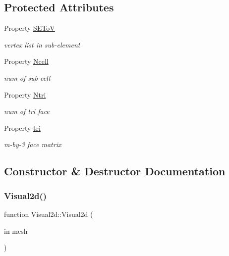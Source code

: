 \subsection*{Protected Attributes}
\begin{DoxyCompactItemize}
\item 
Property \hyperlink{class_visual2d_ac0c516e7d0e1f95d603d402d08aa7b1f}{S\+E\+ToV}
\begin{DoxyCompactList}\small\item\em vertex list in sub-\/element \end{DoxyCompactList}\item 
Property \hyperlink{class_visual2d_a08dc197ac46780ae8ce211aada821c32}{Ncell}
\begin{DoxyCompactList}\small\item\em num of sub-\/cell \end{DoxyCompactList}\item 
Property \hyperlink{class_visual2d_a4ad05f8f0bdbf5882f6f12608d7245ff}{Ntri}
\begin{DoxyCompactList}\small\item\em num of tri face \end{DoxyCompactList}\item 
Property \hyperlink{class_visual2d_a18565fea69868aeb5a70b3fee03d635d}{tri}
\begin{DoxyCompactList}\small\item\em m-\/by-\/3 face matrix \end{DoxyCompactList}\end{DoxyCompactItemize}


\subsection{Constructor \& Destructor Documentation}
\mbox{\label{class_visual2d_ab6bbc8d7de69a10e094158681bc564a7}} 
\subsubsection{\texorpdfstring{Visual2d()}{Visual2d()}}
{\footnotesize\ttfamily function Visual2d\+::\+Visual2d (\begin{DoxyParamCaption}\item[{in}]{mesh }\end{DoxyParamCaption})}



